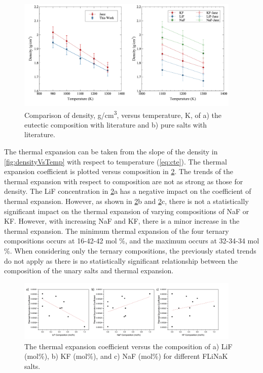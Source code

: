 \documentclass[preprint,12pt]{elsarticle}
\providecommand{\DIFaddbeginFL}{} %
\providecommand{\DIFaddendFL}{} %
\providecommand{\DIFdelbeginFL}{} %
\providecommand{\DIFdelendFL}{} %
\newcommand{\DIFscaledelfig}{0.5}
\newlength{\DIFdelgraphicswidth} %
\newlength{\DIFdelgraphicsheight} %
\newcommand{\DIFaddincludegraphics}[2][]{{\color{blue}\fbox{\DIFOincludegraphics[#1]{#2}}}} %
\newcommand{\DIFdelincludegraphics}[2][]{%
\sbox{\DIFdelgraphicsbox}{\DIFOincludegraphics[#1]{#2}}%
\settoboxwidth{\DIFdelgraphicswidth}{\DIFdelgraphicsbox} %
\settoboxtotalheight{\DIFdelgraphicsheight}{\DIFdelgraphicsbox} %
\scalebox{\DIFscaledelfig}{%
\parbox[b]{\DIFdelgraphicswidth}{\usebox{\DIFdelgraphicsbox}\\[-\baselineskip] \rule{\DIFdelgraphicswidth}{0em}}\llap{\resizebox{\DIFdelgraphicswidth}{\DIFdelgraphicsheight}{%
\setlength{\unitlength}{\DIFdelgraphicswidth}%
\begin{picture}(1,1)%
\thicklines\linethickness{2pt} %
{\color[rgb]{1,0,0}\put(0,0){\framebox(1,1){}}}%
{\color[rgb]{1,0,0}\put(0,0){\line( 1,1){1}}}%
{\color[rgb]{1,0,0}\put(0,1){\line(1,-1){1}}}%
\end{picture}%
}\hspace*{3pt}}} %
} %
\DeclareRobustCommand{\DIFaddbeginFL}{\DIFOaddbeginFL \let\includegraphics\DIFaddincludegraphics} %
\DeclareRobustCommand{\DIFaddendFL}{\DIFOaddendFL \let\includegraphics\DIFOincludegraphics} %
\DeclareRobustCommand{\DIFdelbeginFL}{\DIFOdelbeginFL \let\includegraphics\DIFdelincludegraphics} %
\DeclareRobustCommand{\DIFdelendFL}{\DIFOaddendFL \let\includegraphics\DIFOincludegraphics} %
\begin{document}
\begin{figure}[!h]
\centering
\DIFdelbeginFL %
\DIFdelendFL \DIFaddbeginFL \includegraphics[width=0.95\textwidth]{fig5.jpg}
\DIFaddendFL \caption{Comparison of density, g/cm\textsuperscript{3}, versus temperature, K, of a) the eutectic composition with literature\cite{Janz1981} and b) pure salts with literature\cite{JanzSaltProp}.}
\label{fig:densityCompare}
\end{figure}



The thermal expansion can be taken from the slope of the density in \cref{fig:densityVsTemp} with respect to temperature (\cref{eq:cte}). The thermal expansion coefficient is plotted versus composition in \cref{fig:therm3comp}. The trends of the thermal expansion with respect to composition are not as strong as those for density. The LiF concentration in \cref{fig:therm3comp}a has a negative impact on the coefficient of thermal expansion. However, as shown in \cref{fig:therm3comp}b and \cref{fig:therm3comp}c, there is not a statistically significant impact on the thermal expansion of varying compositions of NaF or KF. However, with increasing NaF and KF, there is a minor increase in the thermal expansion. The minimum thermal expansion of the four ternary compositions occurs at 16-42-42 mol \%, and the maximum occurs at 32-34-34 mol \%. When considering only the ternary compositions, the previously stated trends do not apply as there is no statistically significant relationship between the composition of the unary salts and thermal expansion.

\begin{figure}[!h]
    \centering
    \includegraphics[width=0.95\textwidth]{thermalAll3_correctOrder.jpg}
    \caption{The thermal expansion coefficient versus the composition of a) LiF (mol\%), b) KF (mol\%), and c) NaF (mol\%) for different FLiNaK salts.}
    \label{fig:therm3comp}
\end{figure}
\end{document}
